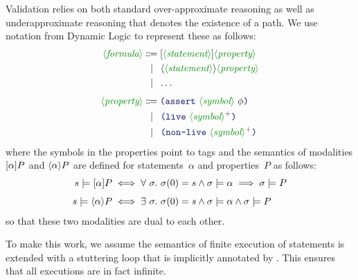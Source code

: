 \documentclass[runningheads]{llncs}
\begin{document}
Validation relies on both standard over-approximate reasoning
as well as underapproximate reasoning that denotes the existence of a path.
We use notation from Dynamic Logic to represent these as follows:
\begin{align*}
\nonterminal{formula}
    & \Coloneqq \BOX{\nonterminal{statement}}{\nonterminal{property}} \\
    & \alt      \DIA{\nonterminal{statement}}{\nonterminal{property}} \\
    & \alt \dots \\[4pt]
\nonterminal{property}
    & \Coloneqq \LP \terminal{assert}~ \nonterminal{symbol}~ \phi \RP \\
    & \alt      \LP \terminal{live}~ \nonterminal{symbol}\rplus \RP \\
    & \alt      \LP \terminal{non-live}~ \nonterminal{symbol}\rplus \RP
\end{align*}
where the symbols in the properties point to tags
and the semantics of modalities
$[\alpha]P$ and
$\langle\alpha\rangle P$ are defined
for statements~$\alpha$ and properties~$P$ as follows:
\begin{align*}
s \models [\alpha]P
    & \iff
        \forall\ \sigma.\ \sigma(0) = s \land \sigma \models \alpha
                \implies \sigma \models P \\[4pt]
s \models \langle\alpha\rangle P
    & \iff
        \exists\ \sigma.\ \sigma(0) = s \land \sigma \models \alpha
                \land \sigma \models P
\end{align*}
so that these two modalities are dual to each other.

To make this work, we assume the semantics of finite execution of statements
is extended with a stuttering loop that is implicitly annotated by
 .
This ensures that all executions are in fact infinite.
\end{document}

